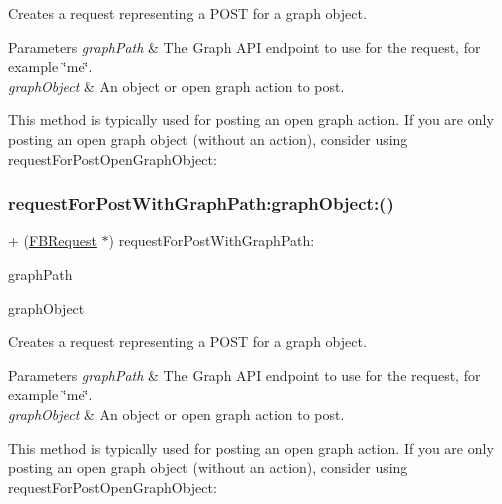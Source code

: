 Creates a request representing a P\+O\+ST for a graph object.


\begin{DoxyParams}{Parameters}
{\em graph\+Path} & The Graph A\+PI endpoint to use for the request, for example \char`\"{}me\char`\"{}.\\
\hline
{\em graph\+Object} & An object or open graph action to post.\\
\hline
\end{DoxyParams}
This method is typically used for posting an open graph action. If you are only posting an open graph object (without an action), consider using {\ttfamily request\+For\+Post\+Open\+Graph\+Object\+:} \mbox{\label{interfaceFBRequest_ac3f506dd49d0757265f44b41c9579c8b}} 
\subsubsection{\texorpdfstring{request\+For\+Post\+With\+Graph\+Path\+:graph\+Object\+:()}{requestForPostWithGraphPath:graphObject:()}\hspace{0.1cm}{\footnotesize\ttfamily [4/5]}}
{\footnotesize\ttfamily + (\hyperlink{interfaceFBRequest}{F\+B\+Request} $\ast$) request\+For\+Post\+With\+Graph\+Path\+: \begin{DoxyParamCaption}\item[{(N\+S\+String $\ast$)}]{graph\+Path }\item[{graphObject:(id$<$ \hyperlink{interfaceFBGraphObject}{F\+B\+Graph\+Object} $>$)}]{graph\+Object }\end{DoxyParamCaption}}

Creates a request representing a P\+O\+ST for a graph object.


\begin{DoxyParams}{Parameters}
{\em graph\+Path} & The Graph A\+PI endpoint to use for the request, for example \char`\"{}me\char`\"{}.\\
\hline
{\em graph\+Object} & An object or open graph action to post.\\
\hline
\end{DoxyParams}
This method is typically used for posting an open graph action. If you are only posting an open graph object (without an action), consider using {\ttfamily request\+For\+Post\+Open\+Graph\+Object\+:} \mbox{\label{interfaceFBRequest_ac3f506dd49d0757265f44b41c9579c8b}} 
